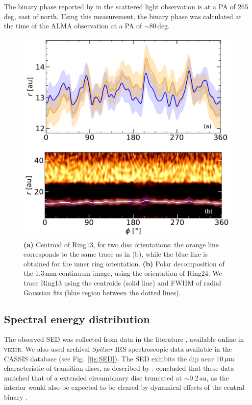 \documentclass[fleqn,usenatbib,useAMS]{mnras}
\begin{document}
The binary phase reported by \citet{dOrazi} in the scattered light observation is at a PA of 265\,deg, east of north. Using this measurement, the binary phase was calculated at the time of the ALMA observation at a PA of $\sim$80\,deg.

\begin{figure}
    \includegraphics[width=\columnwidth]{polar_ring_aprox_and_diff_inner.pdf}
    \caption{{\bf (a)} Centroid of Ring13, for two disc orientations: the orange line corresponds to the same trace as in (b), while the blue line is obtained for the inner ring orientation. {\bf (b)} Polar decomposition of the 1.3\,mm continuum image, using the orientation of Ring24. We trace Ring13 using the centroids (solid line) and FWHM of radial Gaussian fits (blue region between the dotted lines).}
    \label{fig:polarring}
\end{figure}

\subsection{Spectral energy distribution} \label{subsec:SED}

The observed SED was collected from data in the literature \citep{1988iras....7.....H, 1990A&A...234..230H, Jensen_97, 2000A&A...355L..27H, 2001KFNT...17..409K, 2003yCat.2246....0C, 2007PASJ...59S.369M, 2008PASP..120.1128O, 2010A&A...514A...1I, 2012yCat.2311....0C}, available online in \textsc{vizier}. We also used archival \textit{Spitzer} IRS spectroscopic data available in the CASSIS database \citep{Lebouteiller_2015} (see Fig.~\ref{fig:SED}). The SED exhibits the dip near 10\,$\hbox{$\mu$m}$ characteristic of transition discs, as described by \citet{Rosenfeld_2013}. \citet{Jensen_97} concluded that these data matched that of a extended circumbinary disc truncated at $\sim$0.2\,au, as the interior would also be expected to be cleared by dynamical effects of the central binary \citep{Art_Lu}. 
\end{document}
